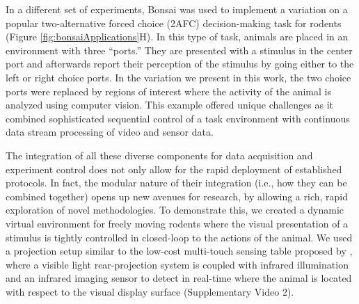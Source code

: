 In a different set of experiments, Bonsai was used to implement a variation on a popular two-alternative forced choice (2AFC) decision-making task for rodents (Figure \ref{fig:bonsaiApplications}H). In this type of task, animals are placed in an environment with three “ports.” They are presented with a stimulus in the center port and afterwards report their perception of the stimulus by going either to the left or right choice ports. In the variation we present in this work, the two choice ports were replaced by regions of interest where the activity of the animal is analyzed using computer vision. This example offered unique challenges as it combined sophisticated sequential control of a task environment with continuous data stream processing of video and sensor data.

The integration of all these diverse components for data acquisition and experiment control does not only allow for the rapid deployment of established protocols. In fact, the modular nature of their integration (i.e., how they can be combined together) opens up new avenues for research, by allowing a rich, rapid exploration of novel methodologies. To demonstrate this, we created a dynamic virtual environment for freely moving rodents where the visual presentation of a stimulus is tightly controlled in closed-loop to the actions of the animal. We used a projection setup similar to the low-cost multi-touch sensing table proposed by \cite{Han2005}, where a visible light rear-projection system is coupled with infrared illumination and an infrared imaging sensor to detect in real-time where the animal is located with respect to the visual display surface (Supplementary Video 2).
